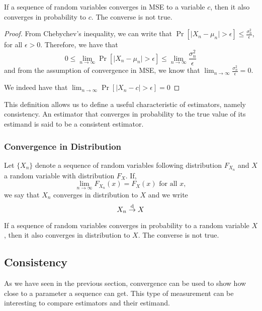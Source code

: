 \begin{proposition} If a sequence of random variables converges in MSE to a variable $c$, then it also converges in probability to $c$. The converse is not true.
\end{proposition}
\begin{proof}
From Chebychev's inequality, we can write that $ \operatorname{Pr}[\lvert X_n - \mu_n \rvert > \epsilon ] \leq \frac{\sigma_n^2}{\epsilon} $, for all $\epsilon >0$. Therefore, we have that $$0\leq \lim_{n\to\infty} \operatorname{Pr}[\lvert X_n - \mu_n \rvert > \epsilon] \leq \lim_{n\to\infty} \frac{\sigma_n^2}{\epsilon} $$ and from the assumption of convergence in MSE, we know that $\lim_{n\to\infty} \frac{\sigma_n^2}{\epsilon} = 0$.

We indeed have that $\lim_{n\to\infty} \operatorname{Pr}[\lvert X_n - c \rvert > \epsilon] = 0$
\end{proof}

This definition allows us to define a useful characteristic of estimators, namely consistency. An estimator that converges in probability to the true value of its estimand is said to be a consistent estimator.

\subsubsection{Convergence in Distribution}

\begin{definition}
Let $\{X_n\}$ denote a sequence of random variables following distribution $F_{X_n}$ and $X$ a random variable with distribution $F_X$. If, $$ \lim_{n\to\infty} F_{X_n}(x) = F_X(x) \text{ for all } x, $$
we say that $X_n$ converges in distribution to $X$ and we write $$ X_n \overset{\text{d}}{\to} X $$
\end{definition}

\begin{proposition}
If a sequence of random variables converges in probability to a random variable $X$, then it also converges in distribution to $X$. The converse is not true.
\end{proposition}

\subsection{Consistency}

As we have seen in the previous section, convergence can be used to show how close to a parameter a sequence can get. This type of measurement can be interesting to compare estimators and their estimand.

